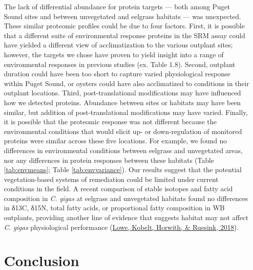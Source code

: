 \documentclass [11pt, proquest] {uwthesis}[2015/03/03]
\begin{document}
The lack of differential abundance for protein targets --- both among Puget Sound sites and between unvegetated and eelgrass habitats --- was unexpected. These similar proteomic profiles could be due to four factors. First, it is possible that a different suite of environmental response proteins in the SRM assay could have yielded a different view of acclimatization to the various outplant sites; however, the targets we chose have proven to yield insight into a range of environmental responses in previous studies (ex. Table 1.8). Second, outplant duration could have been too short to capture varied physiological response within Puget Sound, or oysters could have also acclimatized to conditions in their outplant locations. Third, post-translational modifications may have influenced how we detected proteins. Abundance between sites or habitats may have been similar, but addition of post-translational modifications may have varied. Finally, it is possible that the proteomic response was not different because the environmental conditions that would elicit up- or down-regulation of monitored proteins were similar across these five locations. For example, we found no differences in environmental conditions between eelgrass and unvegetated areas, nor any differences in protein responses between these habitats (Table \ref{tab:envmeans}; Table \ref{tab:envvariance}). Our results suggest that the potential vegetation-based systems of remediation could be limited under current conditions in the field. A recent comparison of stable isotopes and fatty acid composition in \emph{C. gigas} at eelgrass and unvegetated habitats found no differences in δ13C, δ15N, total fatty acids, or proportional fatty composition in WB outplants, providing another line of evidence that suggests habitat may not affect \emph{C. gigas} physiological performance (\protect\hyperlink{ref-Lowe2018}{Lowe, Kobelt, Horwith, \& Ruesink, 2018}).

\hypertarget{conclusion}{%
\section{Conclusion}\label{conclusion}}
\end{document}
